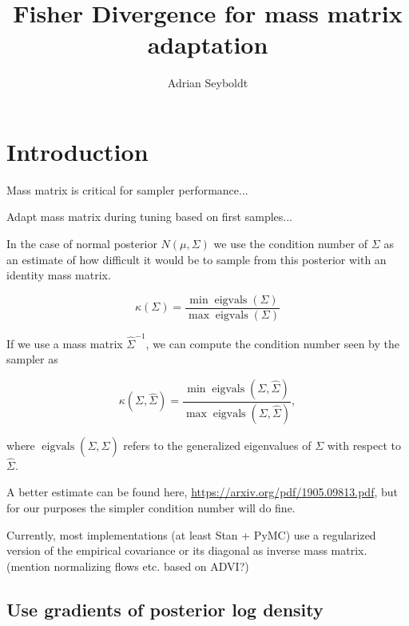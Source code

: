 \documentclass{scrartcl}
\title{Fisher Divergence for mass matrix adaptation}
\author{Adrian Seyboldt}
\DeclareMathOperator{\eigvals}{eigvals}
\DeclarePairedDelimiter{\norm}{\lVert}{\rVert}
\begin{document}
\maketitle

\section{Introduction}

Mass matrix is critical for sampler performance...

Adapt mass matrix during tuning based on first samples...

In the case of normal posterior $N(\mu, \Sigma)$ we use the condition number of
$\Sigma$ as an estimate of how difficult it would be to sample from this
posterior with an identity mass matrix.

\[
\kappa(\Sigma) = \frac{\min{\eigvals(\Sigma)}}{\max{\eigvals(\Sigma)}}
\]

If we use a mass matrix $\hat{\Sigma}^{-1}$, we can compute the
condition number seen by the sampler as

\[
\kappa(\Sigma, \hat{\Sigma})
  = \frac{\min{\eigvals(\Sigma, \hat\Sigma)}}{\max{\eigvals(\Sigma, \hat\Sigma)}},
\]

where $\eigvals(\Sigma, \hat\Sigma)$ refers to the generalized eigenvalues of
$\Sigma$ with respect to $\hat\Sigma$.

A better estimate can be found here,
\url{https://arxiv.org/pdf/1905.09813.pdf}, but for our purposes the simpler
condition number will do fine.

Currently, most implementations (at least Stan + PyMC) use a regularized
version of the empirical covariance or its diagonal as inverse mass matrix.
(mention normalizing flows etc. based on ADVI?)






\subsection{Use gradients of posterior log density}
\end{document}
